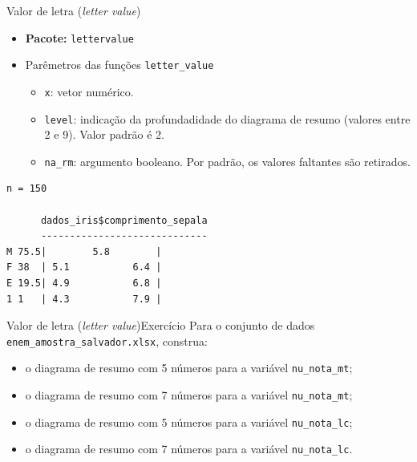 \documentclass[
  10pt,
  ignorenonframetext,
]{beamer}
\newenvironment{Shaded}{\begin{snugshade}}{\end{snugshade}}
\newcommand{\AttributeTok}[1]{\textcolor[rgb]{0.40,0.45,0.13}{#1}}
\newcommand{\DecValTok}[1]{\textcolor[rgb]{0.68,0.00,0.00}{#1}}
\newcommand{\FunctionTok}[1]{\textcolor[rgb]{0.28,0.35,0.67}{#1}}
\newcommand{\NormalTok}[1]{\textcolor[rgb]{0.00,0.23,0.31}{#1}}
\newcommand{\SpecialCharTok}[1]{\textcolor[rgb]{0.37,0.37,0.37}{#1}}
\providecommand{\tightlist}{%
  \setlength{\itemsep}{0pt}\setlength{\parskip}{0pt}}\usepackage{longtable,booktabs,array}
\begin{document}
\begin{frame}[fragile]{Valor de letra (\emph{letter value})}
\protect\hypertarget{valor-de-letra-letter-value-2}{}
\begin{itemize}
\tightlist
\item
  \textbf{Pacote:} \texttt{lettervalue}
\item
  Parêmetros das funções \texttt{letter\_value}

  \begin{itemize}
  \tightlist
  \item
    \texttt{x}: vetor numérico.
  \item
    \texttt{level}: indicação da profundadidade do diagrama de resumo
    (valores entre 2 e 9). Valor padrão é 2.
  \item
    \texttt{na\_rm}: argumento booleano. Por padrão, os valores
    faltantes são retirados.
  \end{itemize}
\end{itemize}

\begin{Shaded}
\end{Shaded}

\begin{verbatim}
n = 150

      dados_iris$comprimento_sepala
      -----------------------------
M 75.5|        5.8        |
F 38  | 5.1           6.4 |
E 19.5| 4.9           6.8 |
1 1   | 4.3           7.9 |
\end{verbatim}
\end{frame}

\begin{frame}[fragile]{Valor de letra (\emph{letter
value})\newline Exercício}
\protect\hypertarget{valor-de-letra-letter-valueexercuxedcio}{}
Para o conjunto de dados \texttt{enem\_amostra\_salvador.xlsx},
construa:

\begin{itemize}
\tightlist
\item
  o diagrama de resumo com 5 números para a variável
  \texttt{nu\_nota\_mt};
\item
  o diagrama de resumo com 7 números para a variável
  \texttt{nu\_nota\_mt};
\item
  o diagrama de resumo com 5 números para a variável
  \texttt{nu\_nota\_lc};
\item
  o diagrama de resumo com 7 números para a variável
  \texttt{nu\_nota\_lc}.
\end{itemize}
\end{frame}
\end{document}
